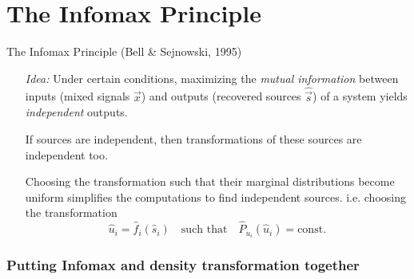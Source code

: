 
\section{The Infomax Principle}


\begin{frame}{The Infomax Principle (Bell \& Sejnowski, 1995)}

\begin{itemize}
\item[\emph{Idea:}] Under certain conditions, maximizing the
  \emph{mutual information} between inputs (mixed signals $\vec x$) and outputs
  (recovered sources $\widehat{\vec s}$) of a system yields \emph{independent} outputs.\\
  
  \svspace{5mm}
  
\item[]
  If sources are independent, then
  transformations of these sources are independent too.\\
  
  \svspace{5mm}
  
\item[]  
  Choosing the transformation such that their marginal distributions become uniform 
  simplifies the computations to find independent sources. i.e. choosing the transformation \\
  
\begin{equation}
\widehat{u}_i = \widehat{f}_i(\widehat{s}_i)
\quad \text{such that} \quad
\widehat{P}_{u_i}(\widehat{u}_i) = \mathrm{const.}
\label{eq:transfconst}
\end{equation}

\end{itemize}

\end{frame}

\subsubsection{Putting Infomax and density transformation together}

